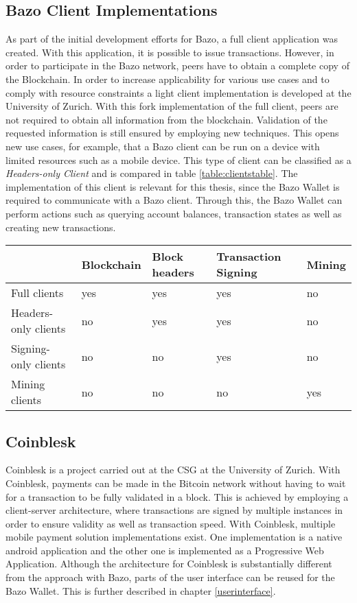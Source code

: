 \subsection{Bazo Client Implementations}
As part of the initial development efforts for Bazo, a full client application was created. With this application, it is possible to issue transactions. However, in order to participate in the Bazo network, peers have to obtain a complete copy of the Blockchain. In order to increase applicability for various use cases and to comply with resource constraints a light client implementation is developed at the University of Zurich. With this fork implementation of the full client, peers are not required to obtain all information from the blockchain. Validation of the requested information is still ensured by employing new techniques. This opens new use cases, for example, that a Bazo client can be run on a device with limited resources such as a mobile device. This type of client can be classified as a \textit{Headers-only Client} \cite{bitcoinclients} and is compared in table \ref{table:clientstable}.
The implementation of this client is relevant for this thesis, since the Bazo Wallet is required to communicate with a Bazo client. Through this, the Bazo Wallet can perform actions such as querying account balances, transaction states as well as creating new transactions.

\begin{center}\label{table:clientstable}
    \begin{tabular}{ | l | l | l | l | p{3cm} |}
    \hline
      & Blockchain & Block headers & Transaction Signing & Mining \\ \hline
    Full clients  & yes & yes & yes & no \\ \hline
    Headers-only clients  & no & yes & yes & no \\ \hline    
    Signing-only clients  & no & no & yes & no \\ \hline
    Mining clients  & no & no & no & yes \\ \hline
    \end{tabular}

\end{center}
\subsection{Coinblesk}
Coinblesk is a project carried out at the CSG at the University of Zurich. With Coinblesk, payments can be made in the Bitcoin network without having to wait for a transaction to be fully validated in a block. This is achieved by employing a client-server architecture, where transactions are signed by multiple instances in order to ensure validity as well as transaction speed.
With Coinblesk, multiple mobile payment solution implementations exist. One implementation is a native android application and the other one is implemented as a Progressive Web Application. Although the architecture for Coinblesk is substantially different from the approach with Bazo, parts of the user interface can be reused for the Bazo Wallet. This is further described in chapter \ref{userinterface}.
